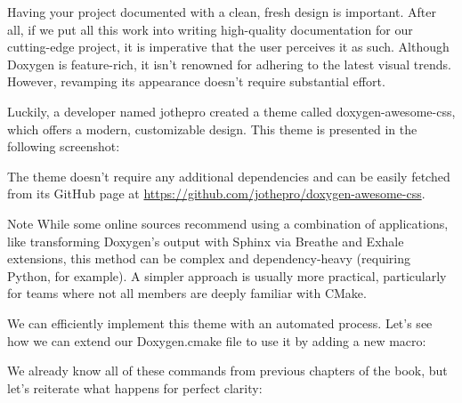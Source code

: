 Having your project documented with a clean, fresh design is important. After all, if we put all this work into writing high-quality documentation for our cutting-edge project, it is imperative that the user perceives it as such. Although Doxygen is feature-rich, it isn’t renowned for adhering to the latest visual trends. However, revamping its appearance doesn’t require substantial effort.

Luckily, a developer named jothepro created a theme called doxygen-awesome-css, which offers a modern, customizable design. This theme is presented in the following screenshot:


The theme doesn’t require any additional dependencies and can be easily fetched from its GitHub page at \url{https://github.com/jothepro/doxygen-awesome-css}.

\begin{myNotic}{Note}
While some online sources recommend using a combination of applications, like transforming Doxygen’s output with Sphinx via Breathe and Exhale extensions, this method can be complex and dependency-heavy (requiring Python, for example). A simpler approach is usually more practical, particularly for teams where not all members are deeply familiar with CMake.
\end{myNotic}

We can efficiently implement this theme with an automated process. Let’s see how we can extend our Doxygen.cmake file to use it by adding a new macro:



We already know all of these commands from previous chapters of the book, but let’s reiterate what happens for perfect clarity:

